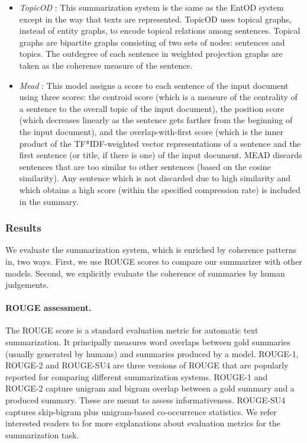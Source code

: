 \begin{itemize}
	\item \emph{TopicOD} \cite{parveen15b}: 
	This summarization system is the same as the EntOD system except in the way that texts are represented. 
	TopicOD uses topical graphs, instead of entity graphs, to encode topical relations among sentences. 
	Topical graphs are bipartite graphs consisting of two sets of nodes: sentences and topics. 
	The outdegree of each sentence in weighted projection graphs are taken as the coherence measure of the sentence.

	\item \emph{Mead} \cite{radev04b}: This model assigns a score to each sentence of the input document using three scores: the centroid score (which is a measure of the centrality of a sentence to the overall topic of the input document), the position score (which decreases linearly as the sentence gets farther from the beginning of the input document), and the \mbox{overlap-with-first} score (which is the inner product of the TF*IDF-weighted vector representations of a sentence and the first sentence (or title, if there is one) of the input document. 
	MEAD discards sentences that are too similar to other sentences (based on the cosine similarity). 
	Any sentence which is not discarded due to high similarity and which obtains a high score (within the specified compression rate) is included in the summary. 
	
\end{itemize}


\subsubsection{Results }
We evaluate the summarization system, which is enriched by coherence patterns in, two ways. 
First, we use ROUGE scores to compare our summarizer with other models. 
Second, we explicitly evaluate the coherence of summaries by human judgements.

\paragraph{ROUGE assessment.}
The ROUGE score \cite{linchinyew04} is a standard evaluation metric for automatic text summarization. 
It principally measures word overlaps between gold summaries (usually generated by humans) and summaries produced by a model. 
ROUGE-1, ROUGE-2 and ROUGE-SU4 are three versions of ROUGE that are popularly reported for comparing different summarization systems. 
ROUGE-1 and ROUGE-2 capture unigram and bigram overlap between a gold summary and a produced summary. 
These are meant to assess informativeness. 
ROUGE-SU4 captures skip-bigram plus unigram-based co-occurrence statistics. 
We refer interested readers to   for more explanations about evaluation metrics for the summarization task. 

